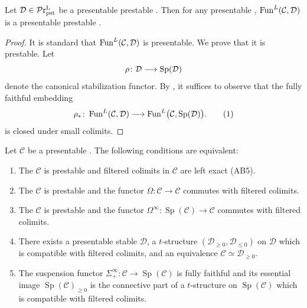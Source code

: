 \documentclass[a4paper,10pt, oneside]{amsart}
\begin{document}
	\begin{prop}
	Let $\mathcal{D}\in\mathcal{P}\mathrm{r}^\mathrm{L}_{\mathrm{pst}}$ be a presentable prestable \infcat. Then for any presentable \infcat \mcc, $\operatorname{Fun}^L(\mathcal{C},\mathcal{D})$ is a presentable prestable \infcat.
\end{prop}
\begin{proof} 
	It is standard that $\operatorname{Fun}^L(\mathcal{C},\mathcal{D})$ is presentable. We prove that it is prestable.  Let \[ \rho\colon \mathcal{D}\longrightarrow \operatorname{Sp}(\mathcal{D}) \] denote the canonical stabilization functor. By \cite[Corollary C.1.2.3]{sag}, it suffices to observe that the fully faithful embedding \[ \rho_*\colon \operatorname{Fun}^L(\mathcal{C},\mathcal{D}) \longrightarrow \operatorname{Fun}^L\bigl(\mathcal{C},\operatorname{Sp}(\mathcal{D})\bigr). \tag{1} \] is closed under small colimits.
	\end{proof}
	\begin{prop}
		Let $\mathcal{C}$ be a presentable \infcat. The following conditions are equivalent:
		\begin{enumerate}[label=(\alph*),font=\normalfont]
			\item The \infcat $\mathcal{C}$ is prestable and filtered colimits in $\mathcal{C}$ are left exact (AB5).
			\item The \infcat $\mathcal{C}$ is prestable and the functor $\Omega: \mathcal{C} \rightarrow \mathcal{C}$ commutes with filtered colimits.
			\item The \infcat $\mathcal{C}$ is prestable and the functor $\Omega^{\infty}: \operatorname{Sp}(\mathcal{C}) \rightarrow \mathcal{C}$ commutes with filtered colimits.
			\item There exists a presentable stable \infcat $\mathcal{D}$, a $t$-structure $\left(\mathcal{D}_{\geq 0}, \mathcal{D}_{\leq 0}\right)$ on $\mathcal{D}$ which is compatible with filtered colimits, and an equivalence $\mathcal{C} \simeq \mathcal{D}_{\geq 0}$.
			\item The suspension functor $\Sigma_+^\infty:\mathcal{C}\to\operatorname{Sp}(\mathcal{C})$ is fully faithful and its essential image $\operatorname{Sp}(\mathcal{C})_{\geq 0}$ is the connective part of a $t$-structure on $\operatorname{Sp}(\mathcal{C})$ which is compatible with filtered colimits.
		\end{enumerate}
	\end{prop}
\end{document}
